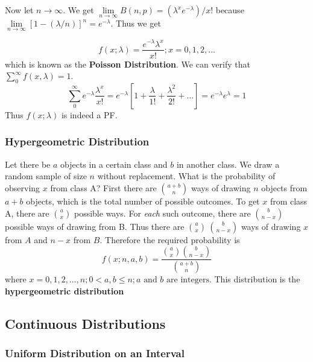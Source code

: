 \documentclass{article}
\begin{document}
Now let \(n \rightarrow \infty\). We get \(\lim\limits_{n \rightarrow \infty} B(n,p) = (\lambda^x e^{-\lambda})/x!\) because \(\lim\limits_{n \rightarrow \infty} [1-(\lambda/n)]^n=e^{-\lambda}\). Thus we get

\begin{equation*}
    f(x;\lambda) = \frac{e^{-\lambda} \lambda^x}{x!}; x=0,1,2,\dots
\end{equation*}
which is known as the \textbf{Poisson Distribution}. We can verify that \(\sum_{0}^{\infty} f(x,\lambda)=1\).
\begin{equation*}
    \sum_{0}^{\infty} e^{-\lambda} \frac{\lambda^x}{x!} = e^{-\lambda} \left[1+\frac{\lambda}{1!}+\frac{\lambda^2}{2!} +\dots\right] = e^{-\lambda}e^\lambda=1
\end{equation*}
Thus \(f(x;\lambda)\) is indeed a PF.

\subsubsection{Hypergeometric Distribution}

Let there be \(a\) objects in a certain class and \(b\) in another class. We draw a random sample of size \(n\) without replacement. What is the probability of observing \(x\) from class A? First there are \(\binom{a+b}{n}\) ways of drawing \(n\) objects from \(a+b\) objects, which is the total number of possible outcomes. To get \(x\) from class A, there are \(\binom{a}{x}\) possible ways. For \textit{each} such outcome, there are \(\binom{b}{n-x}\) possible ways of drawing from B. Thus there are \(\binom{a}{x}\ \binom{b}{n-x}\) ways of drawing \(x\) from \(A\) and \(n-x\) from \(B\). Therefore the required probability is
\begin{equation*}
    f(x;n,a,b)=\frac{\binom{a}{x} \binom{b}{n-x}}{\binom{a+b}{n}}
\end{equation*}
where \(x=0,1,2,\dots,n; 0 < a, b\leq n; a \text{ and } b \text{ are integers.}\) This distribution is the \textbf{hypergeometric distribution}

\subsection{Continuous Distributions}

\subsubsection{Uniform Distribution on an Interval}
\end{document}
